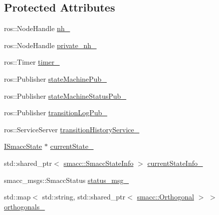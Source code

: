 \subsection*{Protected Attributes}
\begin{DoxyCompactItemize}
\item 
ros\+::\+Node\+Handle \hyperlink{classsmacc_1_1ISmaccStateMachine_ad8877bcca9dbb345fe72cca839c93dd3}{nh\+\_\+}
\item 
ros\+::\+Node\+Handle \hyperlink{classsmacc_1_1ISmaccStateMachine_a9c6a5c647ecca6599589c12fdcd53bfc}{private\+\_\+nh\+\_\+}
\item 
ros\+::\+Timer \hyperlink{classsmacc_1_1ISmaccStateMachine_ab6b00dc92aa86f1074d795fb4057e5bc}{timer\+\_\+}
\item 
ros\+::\+Publisher \hyperlink{classsmacc_1_1ISmaccStateMachine_af4aa9fed70bd4c57b19e3370fbd25de7}{state\+Machine\+Pub\+\_\+}
\item 
ros\+::\+Publisher \hyperlink{classsmacc_1_1ISmaccStateMachine_a55a7c7b26ad4dfea441c62c6326a5414}{state\+Machine\+Status\+Pub\+\_\+}
\item 
ros\+::\+Publisher \hyperlink{classsmacc_1_1ISmaccStateMachine_acc42eb050325c1edc77d81675fb1286a}{transition\+Log\+Pub\+\_\+}
\item 
ros\+::\+Service\+Server \hyperlink{classsmacc_1_1ISmaccStateMachine_a73e2a7ca89c3d807eafe5cfb1e86ea05}{transition\+History\+Service\+\_\+}
\item 
\hyperlink{classsmacc_1_1ISmaccState}{I\+Smacc\+State} $\ast$ \hyperlink{classsmacc_1_1ISmaccStateMachine_a9c6e7745205bcce80a301f2fbe8f7e99}{current\+State\+\_\+}
\item 
std\+::shared\+\_\+ptr$<$ \hyperlink{classsmacc_1_1SmaccStateInfo}{smacc\+::\+Smacc\+State\+Info} $>$ \hyperlink{classsmacc_1_1ISmaccStateMachine_ac8ac420db18ed72cc0c7535f16c0aae8}{current\+State\+Info\+\_\+}
\item 
smacc\+\_\+msgs\+::\+Smacc\+Status \hyperlink{classsmacc_1_1ISmaccStateMachine_a4f47dd614f12a95e7a3c46d465ce4b13}{status\+\_\+msg\+\_\+}
\item 
std\+::map$<$ std\+::string, std\+::shared\+\_\+ptr$<$ \hyperlink{classsmacc_1_1Orthogonal}{smacc\+::\+Orthogonal} $>$ $>$ \hyperlink{classsmacc_1_1ISmaccStateMachine_ae8e5c25d0aecd91fe496df13751bc667}{orthogonals\+\_\+}
\end{DoxyCompactItemize}
